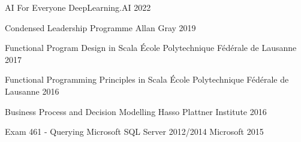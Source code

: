     \begin{cvhonors}
        \cvhonor
            {AI For Everyone}
            {DeepLearning.AI}
            {}
            {2022}

        \cvhonor
            {Condensed Leadership Programme}
            {Allan Gray}
            {}
            {2019}

        \cvhonor
            {Functional Program Design in Scala}
            {École Polytechnique Fédérale de Lausanne}
            {}
            {2017}

        \cvhonor
            {Functional Programming Principles in Scala}
            {École Polytechnique Fédérale de Lausanne}
            {}
            {2016}

        \cvhonor
            {Business Process and Decision Modelling}
            {Hasso Plattner Institute}
            {}
            {2016}

        \cvhonor
            {Exam 461 - Querying Microsoft SQL Server 2012/2014}
            {Microsoft}
            {}
            {2015}

    \end{cvhonors}
